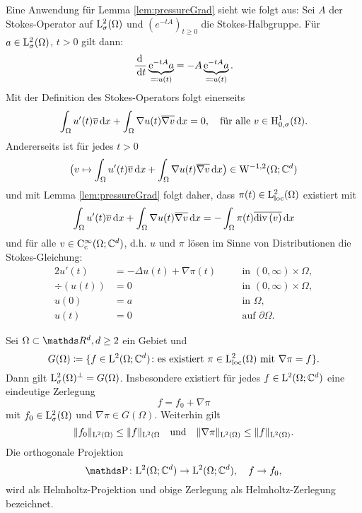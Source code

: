 Eine Anwendung für Lemma \ref{lem:pressureGrad} sieht wie folgt aus:
Sei $A$ der Stokes-Operator auf $\mathrm{L}^2_\sigma(\Omega)$ und $(e^{-tA})_{t \geq 0}$ die Stokes-Halbgruppe.
Für $a \in \mathrm{L}^2_\sigma(\Omega)$, $t > 0$ gilt dann:
$$
\frac{\, {\operatorname{d}\!{\ }}}{\, {\operatorname{d}\!{t}}} \underbrace{\mathrm{e}^{-tA} a}_{\eqqcolon u(t)} = - A \underbrace{\mathrm{e}^{-t A} a}_{\eqqcolon u(t)}.
$$
Mit der Definition des Stokes-Operators folgt einerseits
$$
\int_\Omega u'(t) \overline v \, {\operatorname{d}\!{x}} + \int_\Omega \nabla u(t)  \overline{\nabla v} \, {\operatorname{d}\!{x}}= 0, \quad\text{für alle } v \in \mathrm{H}^1_{0,\sigma}(\Omega).
$$
Andererseits ist für jedes $t > 0$ 
$$
\big( v \mapsto \int_\Omega u'(t) \overline v \, {\operatorname{d}\!{x}} + \int_\Omega \nabla u(t) \overline{\nabla v} \, {\operatorname{d}\!{x}} \big) \in \mathrm{W}^{-1,2}(\Omega; \mathbb{C}^d)
$$
und mit Lemma \ref{lem:pressureGrad} folgt daher, dass $\pi(t) \in \mathrm{L}^2_{\operatorname{loc}}(\Omega)$ existiert mit
$$
\int_\Omega u'(t) \overline v \, {\operatorname{d}\!{x}} + \int_\Omega \nabla u(t) \overline{\nabla v} \, {\operatorname{d}\!{x}} = -\int_\Omega \pi(t) \overline{\mathrm{div\,} (v)} \, {\operatorname{d}\!{x}}
$$
und für alle $v \in \mathrm{C}_{\mathrm{c}}^\infty(\Omega; \mathbb{C}^d)$, d.h. $u$ und $\pi$ lösen im Sinne von Distributionen die Stokes-Gleichung:
\begin{alignat*}{2}
  u'(t) &= -\Delta u(t) + \nabla \pi(t) &&\quad\text{in } (0,\infty) \times \Omega, \\
  \div(u(t)) &= 0 &&\quad\text{in } (0,\infty) \times \Omega, \\
  u(0) &= a &&\quad\text{in }  \Omega, \\
  u(t)  &= 0 &&\quad\text{auf } \partial\Omega.
\end{alignat*}

\begin{thm}
  Sei $\Omega \subset \R^d, d \geq 2$ ein Gebiet und
  $$
  G(\Omega) \coloneqq \{ f \in \mathrm{L}^2(\Omega; \mathbb{C}^d) \colon \text{es existiert } \pi \in \mathrm{L}^2_{\operatorname{loc}}(\Omega) \text{ mit } \nabla \pi = f \}.
  $$
  Dann gilt $\mathrm{L}^2_\sigma(\Omega)^\perp = G(\Omega)$.
  Insbesondere existiert für jedes $f \in \mathrm{L}^2(\Omega; \mathbb{C}^d)$ eine eindeutige Zerlegung
  $$
  f = f_0 + \nabla \pi
  $$
  mit $f_0 \in \mathrm{L}^2_\sigma(\Omega)$ und $\nabla\pi \in G(\Omega)$.
  Weiterhin gilt
  $$
  \|f_0\|_{\mathrm{L}^2(\Omega)} \leq \|f\|_{\mathrm{L}^2(\Omega} \quad\text{und}\quad \|\nabla\pi \|_{\mathrm{L}^2(\Omega)} \leq \|f\|_{\mathrm{L}^2(\Omega)}.
  $$
  Die orthogonale Projektion 
  $$
  \PP \colon \Ell^2(\Omega; \C^d) \to \Ell^2(\Omega; \C^d), \quad f \to f_0,
  $$
  wird als Helmholtz-Projektion und obige Zerlegung als Helmholtz-Zerlegung bezeichnet.
\end{thm}


